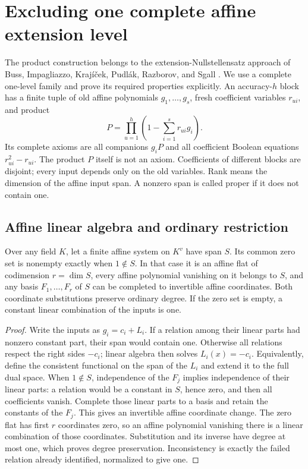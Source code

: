 \section{Excluding one complete affine extension level}\label{sec:affine}

The product construction belongs to the extension-Nullstellensatz approach
of Buss, Impagliazzo, Kraj\'i\v{c}ek, Pudl\'ak, Razborov, and Sgall
\cite{BIKPRS}. We use a complete one-level family and prove its required
properties explicitly. An accuracy-\(h\) block has a finite tuple of old
affine polynomials \(g_1,\ldots,g_s\), fresh coefficient variables
\(r_{ui}\), and product
\begin{equation}\label{eq:block}
 P=\prod_{u=1}^h\left(1-\sum_{i=1}^s r_{ui}g_i\right).
\end{equation}
Its complete axioms are all companions \(g_iP\) and all coefficient
Boolean equations \(r_{ui}^2-r_{ui}\). The product \(P\) itself is not an
axiom. Coefficients of different blocks are disjoint; every input depends
only on the old variables. Rank means the dimension of the affine input
span. A nonzero span is called proper if it does not contain one.

\subsection{Affine linear algebra and ordinary restriction}

\begin{lemma}\label{lem:affine-coordinates}
Over any field \(K\), let a finite affine system on \(K^v\) have span \(S\).
Its common zero set is nonempty exactly when \(1\notin S\).
In that case it is an affine flat of codimension \(r=\dim S\), every
affine polynomial vanishing on it belongs to \(S\), and any basis
\(F_1,\ldots,F_r\) of \(S\) can be completed to invertible affine
coordinates. Both coordinate substitutions preserve ordinary degree.
If the zero set is empty, a constant linear combination of the inputs is one.
\end{lemma}
\begin{proof}
Write the inputs as \(g_i=c_i+L_i\). If a relation among their linear
parts had nonzero constant part, their span would contain one. Otherwise
all relations respect the right sides \(-c_i\); linear algebra then solves
\(L_i(x)=-c_i\). Equivalently, define the consistent functional on the
span of the \(L_i\) and extend it to the full dual space.
When \(1\notin S\), independence of the \(F_j\) implies independence
of their linear parts: a relation would be a constant in \(S\), hence
zero, and then all coefficients vanish. Complete those linear parts to a
basis and retain the constants of the \(F_j\). This gives an invertible
affine coordinate change. The zero flat has first \(r\) coordinates zero,
so an affine polynomial vanishing there is a linear combination of those
coordinates. Substitution and its inverse have degree at most one,
which proves degree preservation. Inconsistency is exactly the failed
relation already identified, normalized to give one.
\end{proof}

